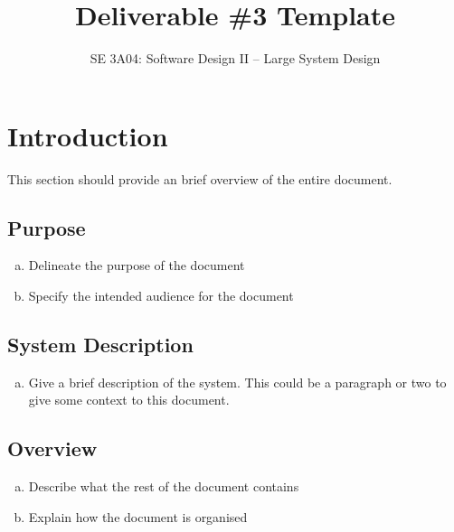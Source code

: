 \documentclass[]{article}
\title{Deliverable \#3 Template}
\author{SE 3A04: Software Design II -- Large System Design}
\date{}
\begin{document}
\maketitle	

\section{Introduction}
\label{sec:introduction}

This section should provide an brief overview of the entire document.

\subsection{Purpose}
\label{sub:purpose}
\begin{enumerate}[a)]
	\item Delineate the purpose of the document
	\item Specify the intended audience for the document
\end{enumerate}

\subsection{System Description}
\label{sub:system_description}
\begin{enumerate}[a)]
	\item Give a brief description of the system. This could be a paragraph or two to give some context to this document.
\end{enumerate}

\subsection{Overview}
\label{sub:overview}
\begin{enumerate}[a)]
	\item Describe what the rest of the document contains 
	\item Explain how the document is organised
\end{enumerate}


\end{document}

